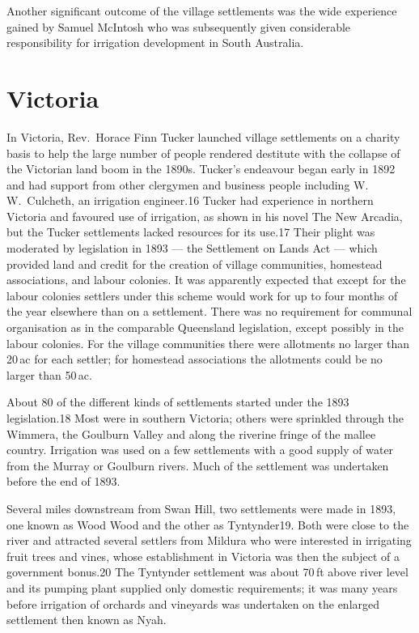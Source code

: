 Another significant outcome of the village settlements was the wide
experience gained by Samuel McIntosh who was subsequently given
considerable responsibility for irrigation development in South
Australia.

\section{Victoria}

In Victoria, Rev.~Horace Finn Tucker launched village settlements on a
charity basis to help the large number of people rendered destitute
with the collapse of the Victorian land boom in the 1890s.  Tucker's
endeavour began early in 1892 and had support from other clergymen and
business people including W.\,W.~Culcheth, an irrigation engineer.16
Tucker had experience in northern Victoria and favoured use of
irrigation, as shown in his novel The New Arcadia, but the Tucker
settlements lacked resources for its use.17 Their plight was moderated
by legislation in 1893 --- the Settlement on Lands Act --- which
provided land and credit for the creation of village communities,
homestead associations, and labour colonies.  It was apparently
expected that except for the labour colonies settlers under this
scheme would work for up to four months of the year elsewhere than on
a settlement.  There was no requirement for communal organisation as
in the comparable Queensland legislation, except possibly in the
labour colonies.  For the village communities there were allotments no
larger than 20\,ac for each settler; for homestead associations the
allotments could be no larger than 50\,ac.

About 80 of the different kinds of settlements started under the 1893
legislation.18 Most were in southern Victoria; others were sprinkled
through the Wimmera, the Goulburn Valley and along the riverine fringe
of the mallee country.  Irrigation was used on a few settlements with
a good supply of water from the Murray or Goulburn rivers.  Much of
the settlement was undertaken before the end of 1893.

Several miles downstream from Swan Hill, two settlements were made in
1893, one known as Wood Wood and the other as Tyntynder19.  Both were
close to the river and attracted several settlers from Mildura who
were interested in irrigating fruit trees and vines, whose
establishment in Victoria was then the subject of a government
bonus.20 The Tyntynder settlement was about 70\,ft above river level
and its pumping plant supplied only domestic requirements; it was many
years before irrigation of orchards and vineyards was undertaken on
the enlarged settlement then known as Nyah.

